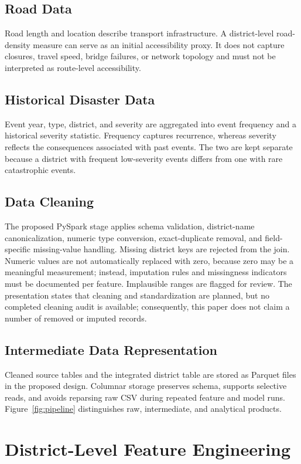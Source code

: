 \documentclass[conference]{IEEEtran}
\begin{document}
\subsection{Road Data}
Road length and location describe transport infrastructure. A district-level
road-density measure can serve as an initial accessibility proxy. It does not
capture closures, travel speed, bridge failures, or network topology and must
not be interpreted as route-level accessibility.

\subsection{Historical Disaster Data}
Event year, type, district, and severity are aggregated into event frequency
and a historical severity statistic. Frequency captures recurrence, whereas
severity reflects the consequences associated with past events. The two are
kept separate because a district with frequent low-severity events differs from
one with rare catastrophic events.

\subsection{Data Cleaning}
The proposed PySpark stage applies schema validation, district-name
canonicalization, numeric type conversion, exact-duplicate removal, and
field-specific missing-value handling. Missing district keys are rejected from
the join. Numeric values are not automatically replaced with zero, because zero
may be a meaningful measurement; instead, imputation rules and missingness
indicators must be documented per feature. Implausible ranges are flagged for
review. The presentation states that cleaning and standardization are planned,
but no completed cleaning audit is available; consequently, this paper does not
claim a number of removed or imputed records.

\subsection{Intermediate Data Representation}
Cleaned source tables and the integrated district table are stored as Parquet
files in the proposed design. Columnar storage preserves schema, supports
selective reads, and avoids reparsing raw CSV during repeated feature and model
runs. Figure~\ref{fig:pipeline} distinguishes raw, intermediate, and analytical
products.

\section{District-Level Feature Engineering}
\end{document}
